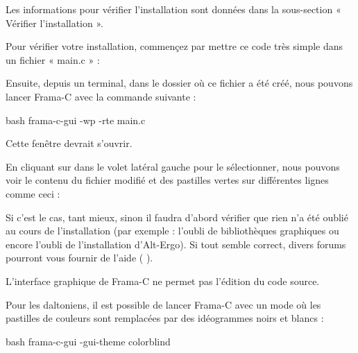 Les informations pour vérifier l'installation sont données dans la sous-section
« Vérifier l'installation ».




Pour vérifier votre installation, commençez par mettre ce code très simple dans
un fichier « main.c » :




Ensuite, depuis un terminal, dans le dossier où ce fichier a été créé,
nous pouvons lancer Frama-C avec la commande suivante :



\begin{CodeBlock}{bash}
frama-c-gui -wp -rte main.c
\end{CodeBlock}



Cette fenêtre devrait s'ouvrir.





En cliquant sur  dans le volet latéral gauche pour le sélectionner,
nous pouvons voir le contenu du fichier  modifié et des pastilles
vertes sur différentes lignes comme ceci :





Si c'est le cas, tant mieux, sinon il faudra d'abord vérifier que rien n'a été
oublié au cours de l'installation (par exemple : l'oubli de bibliothèques graphiques
ou encore l'oubli de l'installation d'Alt-Ergo). Si tout semble correct, divers forums
pourront vous fournir de l'aide
(
 ).



\begin{Warning}
L'interface graphique de Frama-C ne permet pas l'édition du code source.
\end{Warning}


\begin{Information}
Pour les daltoniens, il est possible de lancer Frama-C avec un mode où les
pastilles de couleurs sont remplacées par des idéogrammes noirs et blancs :

\begin{CodeBlock}{bash}
frama-c-gui -gui-theme colorblind
\end{CodeBlock}
\end{Information}


